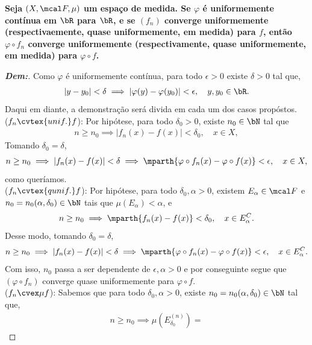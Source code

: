 \textbf{Seja $(X, \mcal F, \mu)$ um espaço de medida. Se $\varphi$ é uniformemente 
contínua em $\bR$ para $\bR$, e se $(f_n)$ converge uniformemente 
(respectivaemente, quase uniformemente, em medida) para $f$, então 
$\varphi \circ f_n$ converge uniformemente (respectivamente, quase uniformemente, 
em medida) para $\varphi \circ f$.}
\begin{proof}[\textbf{Dem:}] Como $\varphi$ é uniformemente contínua, 
  para todo $\epsilon > 0$ existe $\delta > 0$ tal que,
  \begin{align*}
    |y - y_0| <\delta \implies |\varphi(y) - \varphi(y_0)| < \epsilon, \quad y, y_0 \in \bR.
  \end{align*}
  Daqui em diante, a demonstração será divida em cada um dos casos propóstos. \\
  ($f_n \cvtex{unif.} f$): Por hipótese, para todo $\delta_0 > 0$, existe $n_0 \in \bN$
  tal que
  \begin{align*}
    n \ge n_0 \implies |f_n(x) - f(x)| < \delta_0,\quad x \in X,
  \end{align*}
  Tomando $\delta_0 = \delta$, 
  \begin{align*}
    n \ge n_0 \implies |f_n(x) - f(x)| < \delta \implies 
    \mparth{\varphi \circ f_n(x) - \varphi \circ f (x)} < \epsilon, \quad x \in X,
  \end{align*}
  como queríamos.\\
  ($f_n \cvtex{q unif.} f $): Por hipótese, para todo $\delta_0, \alpha > 0$, 
  existem $E_\alpha \in \mcal F$ e $n_0 = n_0(\alpha, \delta_0) \in \bN$ 
  tais que $\mu(E_\alpha) < \alpha$, e
  \begin{align*}
    n \ge n_0 \implies \mparth{f_n(x) - f(x)}<\delta_0, \quad x \in E_\alpha^C.
  \end{align*}
  Desse modo, tomando $\delta_0 = \delta$, 
  \begin{align*}
    n \ge n_0 \implies |f_n(x) - f(x)| < \delta \implies 
    \mparth{\varphi \circ f_n(x) - \varphi \circ f (x)} < \epsilon, \quad x \in E_\alpha^C.
  \end{align*}
  Com isso, $n_0$ passa a ser dependente de $\epsilon, \alpha >0$ e por conseguinte
  segue que $(\varphi \circ f_n)$ converge quase uniformemente para $\varphi \circ f$.\\
  ($f_n \cvex \mu f$): Sabemos que para todo $\delta_0, \alpha > 0$, existe 
  $n_0 = n_0(\alpha, \delta_0) \in \bN$ tal que,
  \begin{align*}
    n \ge n_0 \implies \mu(E_{\delta_0}^{(n)}) = 

\end{align*}
\end{proof}

